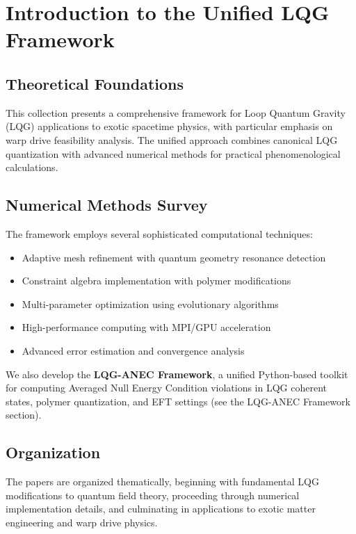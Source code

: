 \documentclass[11pt]{article}
\begin{document}
\section*{Introduction to the Unified LQG Framework}

\subsection*{Theoretical Foundations}
This collection presents a comprehensive framework for Loop Quantum Gravity (LQG) applications to exotic spacetime physics, with particular emphasis on warp drive feasibility analysis. The unified approach combines canonical LQG quantization with advanced numerical methods for practical phenomenological calculations.

\subsection*{Numerical Methods Survey}
The framework employs several sophisticated computational techniques:
\begin{itemize}
  \item Adaptive mesh refinement with quantum geometry resonance detection
  \item Constraint algebra implementation with polymer modifications
  \item Multi-parameter optimization using evolutionary algorithms
  \item High-performance computing with MPI/GPU acceleration
  \item Advanced error estimation and convergence analysis
\end{itemize}

We also develop the \textbf{LQG-ANEC Framework}, a unified Python-based toolkit for computing Averaged Null Energy Condition violations in LQG coherent states, polymer quantization, and EFT settings (see the LQG-ANEC Framework section).

\subsection*{Organization}
The papers are organized thematically, beginning with fundamental LQG modifications to quantum field theory, proceeding through numerical implementation details, and culminating in applications to exotic matter engineering and warp drive physics.
\end{document}
